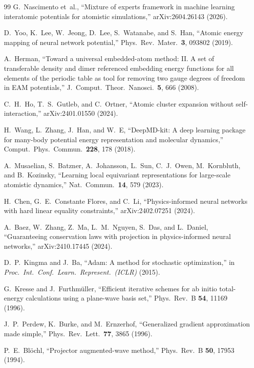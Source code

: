 \documentclass[twoside,prb,aps,floatfix,superscriptaddress,longbibliography]{revtex4-2}
\begin{document}
\begin{thebibliography}{99}
G.~Nascimento et~al., ``Mixture of experts framework in machine learning interatomic potentials for atomistic simulations,'' arXiv:2604.26143 (2026).

D.~Yoo, K.~Lee, W.~Jeong, D.~Lee, S.~Watanabe, and S.~Han, ``Atomic energy mapping of neural network potential,'' Phys.\ Rev.\ Mater.\ \textbf{3}, 093802 (2019).

A.~Herman, ``Toward a universal embedded-atom method: II. A set of transferable density and dimer referenced embedding energy functions for all elements of the periodic table as tool for removing two gauge degrees of freedom in EAM potentials,'' J.\ Comput.\ Theor.\ Nanosci.\ \textbf{5}, 666 (2008).

C.~H.~Ho, T.~S.~Gutleb, and C.~Ortner, ``Atomic cluster expansion without self-interaction,'' arXiv:2401.01550 (2024).

H.~Wang, L.~Zhang, J.~Han, and W.~E, ``DeepMD-kit: A deep learning package for many-body potential energy representation and molecular dynamics,'' Comput.\ Phys.\ Commun.\ \textbf{228}, 178 (2018).

A.~Musaelian, S.~Batzner, A.~Johansson, L.~Sun, C.~J.~Owen, M.~Kornbluth, and B.~Kozinsky, ``Learning local equivariant representations for large-scale atomistic dynamics,'' Nat.\ Commun.\ \textbf{14}, 579 (2023).

H.~Chen, G.~E.~Constante Flores, and C.~Li, ``Physics-informed neural networks with hard linear equality constraints,'' arXiv:2402.07251 (2024).

A.~Baez, W.~Zhang, Z.~Ma, L.~M.~Nguyen, S.~Das, and L.~Daniel, ``Guaranteeing conservation laws with projection in physics-informed neural networks,'' arXiv:2410.17445 (2024).

D.~P.~Kingma and J.~Ba, ``Adam: A method for stochastic optimization,'' in \textit{Proc.\ Int.\ Conf.\ Learn.\ Represent.\ (ICLR)} (2015).

G.~Kresse and J.~Furthm\"{u}ller, ``Efficient iterative schemes for ab initio total-energy calculations using a plane-wave basis set,'' Phys.\ Rev.\ B \textbf{54}, 11169 (1996).

J.~P.~Perdew, K.~Burke, and M.~Ernzerhof, ``Generalized gradient approximation made simple,'' Phys.\ Rev.\ Lett.\ \textbf{77}, 3865 (1996).

P.~E.~Bl\"{o}chl, ``Projector augmented-wave method,'' Phys.\ Rev.\ B \textbf{50}, 17953 (1994).

\end{thebibliography}
\end{document}
